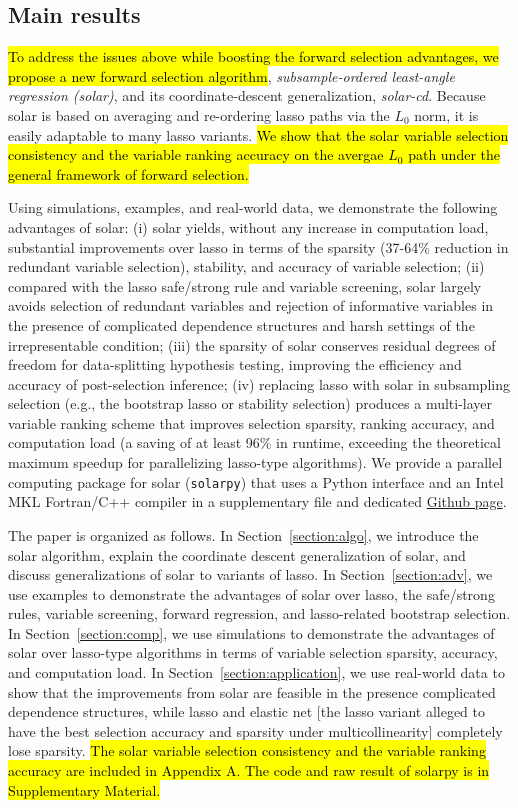 \documentclass[11pt,review,authoryear]{elsarticle}
\begin{document}
\subsection{Main results}

\hl{To address the issues above while boosting the forward selection advantages, we propose a new forward selection algorithm}, \emph{subsample-ordered least-angle regression (solar)}, and its coordinate-descent generalization, \emph{solar-cd}. Because solar is based on averaging and re-ordering lasso paths via the $L_0$ norm, it is easily adaptable to many lasso variants. \hl{We show that the solar variable selection consistency and the variable ranking accuracy on the avergae $L_0$ path under the general framework of forward selection.}

Using simulations, examples, and real-world data, we demonstrate the following advantages of solar: (i) solar yields, without any increase in computation load, substantial improvements over lasso in terms of the sparsity (37-64\% reduction in redundant variable selection), stability, and accuracy of variable selection; (ii) compared with the lasso safe/strong rule and variable screening, solar largely avoids selection of redundant variables and rejection of informative variables in the presence of complicated dependence structures and harsh settings of the irrepresentable condition; (iii) the sparsity of solar conserves residual degrees of freedom for data-splitting hypothesis testing, improving the efficiency and accuracy of post-selection inference; (iv) replacing lasso with solar in subsampling selection (e.g., the bootstrap lasso or stability selection) produces a multi-layer variable ranking scheme that improves selection sparsity, ranking accuracy, and computation load (a saving of at least 96\% in runtime, exceeding the theoretical maximum speedup for parallelizing lasso-type algorithms). We provide a parallel computing package for solar (\texttt{solarpy}) that uses a Python interface and an Intel MKL Fortran/C++ compiler in a supplementary file and dedicated \href{https://github.com/isaac2math/solarpy}{Github page}.

The paper is organized as follows. In Section~\ref{section:algo}, we introduce the solar algorithm, explain the coordinate descent generalization of solar, and discuss generalizations of solar to variants of lasso. In Section~\ref{section:adv}, we use examples to demonstrate the advantages of solar over lasso, the safe/strong rules, variable screening, forward regression, and lasso-related bootstrap selection. In Section~\ref{section:comp}, we use simulations to demonstrate the advantages of solar over lasso-type algorithms in terms of variable selection sparsity, accuracy, and computation load. In Section~\ref{section:application}, we use real-world data to show that the improvements from solar are feasible in the presence complicated dependence structures, while lasso and elastic net [the lasso variant alleged \citep{zou2005regularization, jia2010model} to have the best selection accuracy and sparsity under multicollinearity] completely lose sparsity. \hl{The solar variable selection consistency and the variable ranking accuracy are included in Appendix A. The code and raw result of solarpy is in Supplementary Material.}
\end{document}
